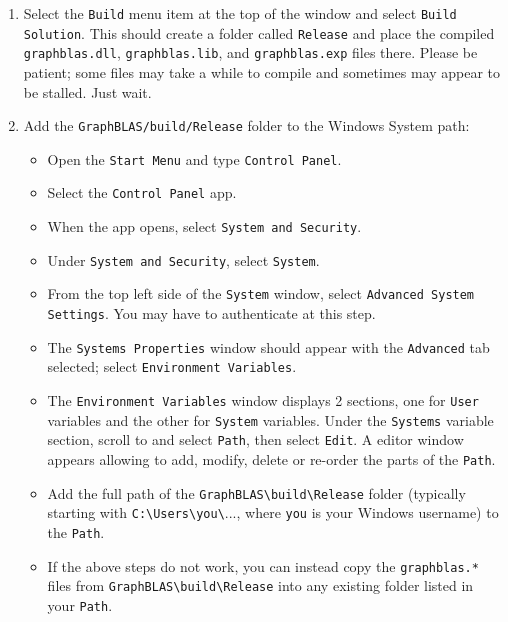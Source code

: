 \documentclass[12pt]{article}
\begin{document}
{\begin{enumerate}
\item Select the \verb'Build' menu item at the top of the window and
    select \verb'Build Solution'.  This should create a folder called
    \verb'Release' and place the compiled \verb'graphblas.dll',
    \verb'graphblas.lib', and \verb'graphblas.exp' files there.  Please be
    patient; some files may take a while to compile and sometimes may appear to
    be stalled.  Just wait.


\item Add the \verb'GraphBLAS/build/Release' folder to the Windows System path:

    \begin{itemize}
    \item Open the \verb'Start Menu' and type \verb'Control Panel'.
    \item Select the \verb'Control Panel' app.
    \item When the app opens, select \verb'System and Security'.
    \item Under \verb'System and Security', select \verb'System'.
    \item From the top left side of the \verb'System' window, select
        \verb'Advanced System Settings'.  You may have to authenticate
        at this step.
    \item The \verb'Systems Properties' window should appear with the
        \verb'Advanced' tab selected;
        select \verb'Environment Variables'.
    \item The \verb'Environment Variables' window displays 2 sections, one for
        \verb'User' variables and the other for \verb'System' variables.  Under
        the \verb'Systems' variable section, scroll to and select \verb'Path',
        then select \verb'Edit'.   A editor window appears allowing to add,
        modify, delete or re-order the parts of the \verb'Path'.
    \item Add the full path of the \verb'GraphBLAS\build\Release' folder
        (typically starting with \verb'C:\Users\you\'..., where \verb'you' is
        your Windows username) to the \verb'Path'.
    \item If the above steps do not work, you can instead copy the
        \verb'graphblas.*' files from \verb'GraphBLAS\build\Release' into any
        existing folder listed in your \verb'Path'. 
    \end{itemize}


\end{enumerate}}
\end{document}
